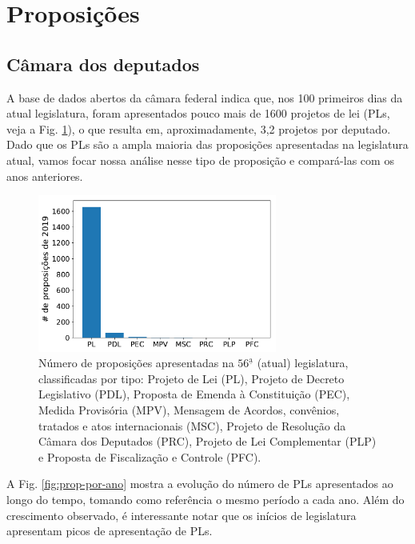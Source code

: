 \documentclass[12pt,a4paper]{article}
\begin{document}
\section{Proposições}

\subsection{Câmara dos deputados}

A base de dados abertos da câmara federal indica que, nos 100 primeiros dias da atual legislatura,
foram apresentados pouco mais de 1600 projetos de lei (PLs, veja a Fig. \ref{fig:prop-2019-tipo}),
o que resulta em, aproximadamente, 3,2 projetos por deputado. Dado que os PLs são a ampla maioria
das proposições apresentadas na legislatura atual, vamos focar nossa análise nesse tipo de proposição e
compará-las com os anos anteriores.

\begin{figure}[H]
\centering
\includegraphics[width=0.7\textwidth]{graficos/proposicoes-2019-por-tipo_2019-05-01.pdf}
\caption{Número de proposições apresentadas na $56^{\mathrm{\underline{a}}}$ (atual) legislatura,
  classificadas por tipo: Projeto de Lei (PL), Projeto de Decreto Legislativo (PDL),
  Proposta de Emenda à Constituição (PEC), Medida Provisória (MPV), Mensagem de Acordos,
  convênios, tratados e atos internacionais (MSC), Projeto de Resolução da Câmara dos Deputados (PRC),
  Projeto de Lei Complementar (PLP) e Proposta de Fiscalização e Controle (PFC).}
\label{fig:prop-2019-tipo}
\end{figure} 

A Fig. \ref{fig:prop-por-ano} mostra a evolução do número de PLs apresentados ao longo do tempo,
tomando como referência o mesmo período a cada ano. Além do crescimento observado, é interessante
notar que os inícios de legislatura apresentam picos de apresentação de PLs.
\end{document}
